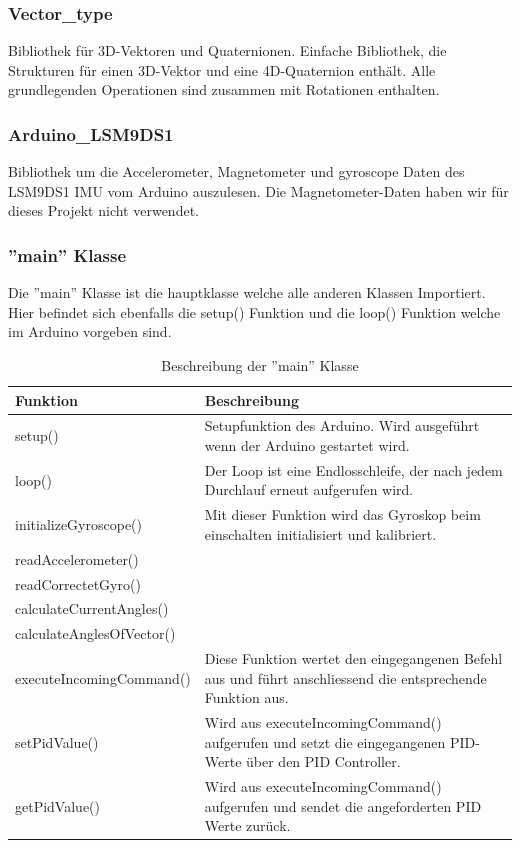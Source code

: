 \subsubsection{Vector\_type}
Bibliothek für 3D-Vektoren und Quaternionen. Einfache Bibliothek, die Strukturen für einen 3D-Vektor und eine 4D-Quaternion enthält. Alle grundlegenden Operationen sind zusammen mit Rotationen enthalten.

\subsubsection{Arduino\_LSM9DS1}
Bibliothek um die Accelerometer, Magnetometer und gyroscope Daten des LSM9DS1 IMU vom Arduino auszulesen. Die Magnetometer-Daten haben wir für dieses Projekt nicht verwendet.


\subsubsection{''main'' Klasse}
Die ''main'' Klasse ist die hauptklasse welche alle anderen Klassen Importiert. Hier befindet sich ebenfalls die setup() Funktion und die loop() Funktion welche im Arduino vorgeben sind.

\begin{table}[H]
  \centering
  \settowidth{}
  \setlength\extrarowheight{2pt}
  \begin{tabulary}{1.0\textwidth}{|L|L|}
    \hline
    \textbf{Funktion} &
    \textbf{Beschreibung}\\
    \hline
    setup() &
    Setupfunktion des Arduino. Wird ausgeführt wenn der Arduino gestartet wird.\\
    \hline
    loop() &
    Der Loop ist eine Endlosschleife, der nach jedem Durchlauf erneut aufgerufen wird.\\
    \hline
    initializeGyroscope() &
    Mit dieser Funktion wird das Gyroskop beim einschalten initialisiert und kalibriert.\\
    \hline
    readAccelerometer() &
    \\
    \hline
    readCorrectetGyro() &
    \\
    \hline
    calculateCurrentAngles() &
    \\
    \hline
    calculateAnglesOfVector() &
    \\
    \hline
    executeIncomingCommand() &
    Diese Funktion wertet den eingegangenen Befehl aus und führt anschliessend die entsprechende Funktion aus.\\
    \hline
    setPidValue() &
    Wird aus executeIncomingCommand() aufgerufen und setzt die eingegangenen PID-Werte über den PID Controller.\\
    \hline
    getPidValue() &
    Wird aus executeIncomingCommand() aufgerufen und sendet die angeforderten PID Werte zurück.\\
    \hline
  \end{tabulary}
  \caption{Beschreibung der ''main'' Klasse}
\end{table}

